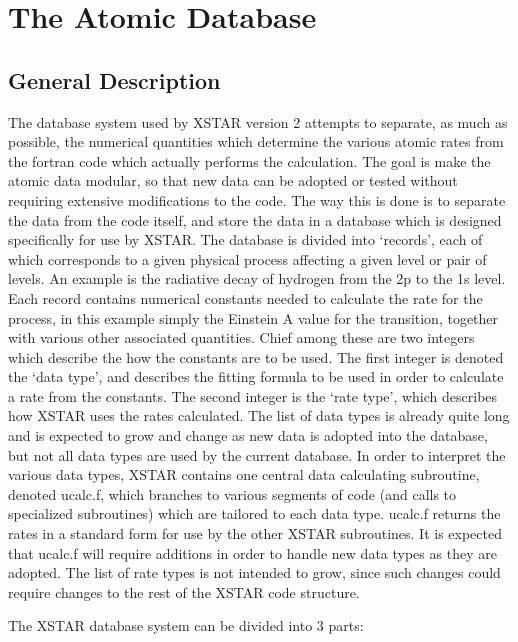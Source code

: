 \chapter{The Atomic Database}
\label{sec:atomicdatabase}


\section{General Description}

The database system used by XSTAR version 2 attempts to 
separate, as much as possible, the numerical quantities which 
determine the various atomic rates from the fortran code 
which actually performs the calculation.  The goal is 
make the atomic data modular, so that new data can be 
adopted or tested without requiring extensive modifications to the 
code.  The way this is done is to separate the data from the code itself,
and store the data in a database which is designed specifically for 
use by XSTAR.  The database is divided into 
`records', each of which corresponds to a given physical 
process affecting a given level or pair of levels. An example is the 
radiative decay of hydrogen from the 2p to the 1s level.
Each record contains numerical constants needed to calculate the 
rate for the process, in this example simply the Einstein A value 
for the transition, together with various other associated quantities.
Chief among these are two integers which describe
the how the constants are to be used.  The first integer 
is denoted the `data type', and describes the fitting formula to be used 
in order to calculate a rate from the constants.  The second 
integer is the `rate type', which describes how XSTAR uses the 
rates calculated.  The list of data types is already quite long 
and is expected to grow and change as new data is adopted into the database,
but not all data types are used by the current database.
In order to interpret the various data types, XSTAR contains 
one central data calculating subroutine, denoted ucalc.f, 
which branches to various segments of code (and calls to specialized 
subroutines) which are tailored to each data type.  
ucalc.f returns the rates in a standard form for use by the other 
XSTAR subroutines.  It is expected that ucalc.f will require additions
in order to handle new data types as they are adopted.  
The list of rate types is not intended to grow, since such changes 
could require changes to the rest of the XSTAR code structure.


The XSTAR database system can be divided into 3 parts:

